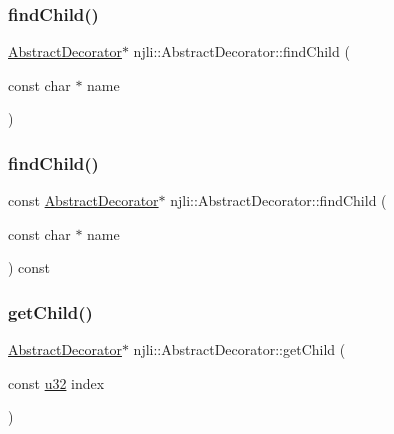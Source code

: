 \subsubsection{\texorpdfstring{find\+Child()}{findChild()}\hspace{0.1cm}{\footnotesize\ttfamily [1/2]}}
{\footnotesize\ttfamily \mbox{\hyperlink{classnjli_1_1_abstract_decorator}{Abstract\+Decorator}}$\ast$ njli\+::\+Abstract\+Decorator\+::find\+Child (\begin{DoxyParamCaption}\item[{const char $\ast$}]{name }\end{DoxyParamCaption})\hspace{0.3cm}{\ttfamily [protected]}}

\mbox{\label{classnjli_1_1_abstract_decorator_af924f47defa4cd007308847e1c6d9c2a}} 
\subsubsection{\texorpdfstring{find\+Child()}{findChild()}\hspace{0.1cm}{\footnotesize\ttfamily [2/2]}}
{\footnotesize\ttfamily const \mbox{\hyperlink{classnjli_1_1_abstract_decorator}{Abstract\+Decorator}}$\ast$ njli\+::\+Abstract\+Decorator\+::find\+Child (\begin{DoxyParamCaption}\item[{const char $\ast$}]{name }\end{DoxyParamCaption}) const\hspace{0.3cm}{\ttfamily [protected]}}

\mbox{\label{classnjli_1_1_abstract_decorator_ab4685efa1283c203aabd7e8b4aa86fb4}} 
\subsubsection{\texorpdfstring{get\+Child()}{getChild()}\hspace{0.1cm}{\footnotesize\ttfamily [1/2]}}
{\footnotesize\ttfamily \mbox{\hyperlink{classnjli_1_1_abstract_decorator}{Abstract\+Decorator}}$\ast$ njli\+::\+Abstract\+Decorator\+::get\+Child (\begin{DoxyParamCaption}\item[{const \mbox{\hyperlink{_util_8h_a10e94b422ef0c20dcdec20d31a1f5049}{u32}}}]{index }\end{DoxyParamCaption})\hspace{0.3cm}{\ttfamily [protected]}}

